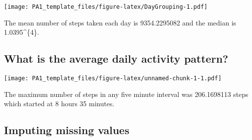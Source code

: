 \documentclass[]{article}
\newenvironment{Shaded}{\begin{snugshade}}{\end{snugshade}}
\newcommand{\KeywordTok}[1]{\textcolor[rgb]{0.13,0.29,0.53}{\textbf{#1}}}
\newcommand{\DataTypeTok}[1]{\textcolor[rgb]{0.13,0.29,0.53}{#1}}
\newcommand{\DecValTok}[1]{\textcolor[rgb]{0.00,0.00,0.81}{#1}}
\newcommand{\CharTok}[1]{\textcolor[rgb]{0.31,0.60,0.02}{#1}}
\newcommand{\StringTok}[1]{\textcolor[rgb]{0.31,0.60,0.02}{#1}}
\newcommand{\OtherTok}[1]{\textcolor[rgb]{0.56,0.35,0.01}{#1}}
\newcommand{\OperatorTok}[1]{\textcolor[rgb]{0.81,0.36,0.00}{\textbf{#1}}}
\newcommand{\NormalTok}[1]{#1}
\begin{document}
\texttt{[image: PA1\_template\_files/figure-latex/DayGrouping-1.pdf]}

The mean number of steps taken each day is 9354.2295082 and the median
is 1.0395\^{}\{4\}.

\subsection{What is the average daily activity
pattern?}\label{what-is-the-average-daily-activity-pattern}

\begin{Shaded}
\end{Shaded}

\texttt{[image: PA1\_template\_files/figure-latex/unnamed-chunk-1-1.pdf]}

The maximum number of steps in any five minute interval was 206.1698113
steps which started at 8 hours 35 minutes.

\subsection{Imputing missing values}\label{imputing-missing-values}
\end{document}
